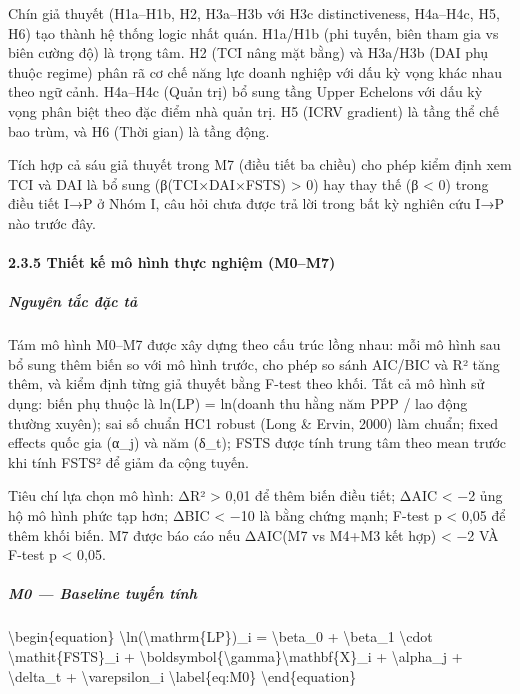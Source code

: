 \documentclass[12pt,a4paper]{article}
\begin{document}
Chín giả thuyết (H1a--H1b, H2, H3a--H3b với H3c distinctiveness,
H4a--H4c, H5, H6) tạo thành hệ thống logic nhất quán. H1a/H1b (phi
tuyến, biên tham gia vs biên cường độ) là trọng tâm. H2 (TCI nâng mặt
bằng) và H3a/H3b (DAI phụ thuộc regime) phân rã cơ chế năng lực doanh
nghiệp với dấu kỳ vọng khác nhau theo ngữ cảnh. H4a--H4c (Quản trị) bổ
sung tầng Upper Echelons với dấu kỳ vọng phân biệt theo đặc điểm nhà
quản trị. H5 (ICRV gradient) là tầng thể chế bao trùm, và H6 (Thời gian)
là tầng động.

Tích hợp cả sáu giả thuyết trong M7 (điều tiết ba chiều) cho phép kiểm
định xem TCI và DAI là bổ sung (β(TCI×DAI×FSTS) \textgreater{} 0) hay
thay thế (β \textless{} 0) trong điều tiết I→P ở Nhóm I, câu hỏi chưa
được trả lời trong bất kỳ nghiên cứu I→P nào trước đây.

\hypertarget{235-thiux1ebft-kux1ebf-muxf4-huxecnh-thux1ef1c-nghiux1ec7m-m0m7}{%
\paragraph{2.3.5 Thiết kế mô hình thực nghiệm
(M0--M7)}\label{235-thiux1ebft-kux1ebf-muxf4-huxecnh-thux1ef1c-nghiux1ec7m-m0m7}}

\hypertarget{nguyuxean-tux1eafc-ux111ux1eb7c-tux1ea3}{%
\subparagraph{Nguyên tắc đặc
tả}\label{nguyuxean-tux1eafc-ux111ux1eb7c-tux1ea3}}

Tám mô hình M0--M7 được xây dựng theo cấu trúc lồng nhau: mỗi mô hình
sau bổ sung thêm biến so với mô hình trước, cho phép so sánh AIC/BIC và
R² tăng thêm, và kiểm định từng giả thuyết bằng F-test theo khối. Tất cả
mô hình sử dụng: biến phụ thuộc là ln(LP) = ln(doanh thu hằng năm PPP /
lao động thường xuyên); sai số chuẩn HC1 robust (Long \& Ervin, 2000)
làm chuẩn; fixed effects quốc gia (α\_j) và năm (δ\_t); FSTS được tính
trung tâm theo mean trước khi tính FSTS² để giảm đa cộng tuyến.

Tiêu chí lựa chọn mô hình: ΔR² \textgreater{} 0,01 để thêm biến điều
tiết; ΔAIC \textless{} −2 ủng hộ mô hình phức tạp hơn; ΔBIC \textless{}
−10 là bằng chứng mạnh; F-test p \textless{} 0,05 để thêm khối biến. M7
được báo cáo nếu ΔAIC(M7 vs M4+M3 kết hợp) \textless{} −2 VÀ F-test p
\textless{} 0,05.

\hypertarget{m0--baseline-tuyux1ebfn-tuxednh}{%
\subparagraph{M0 --- Baseline tuyến
tính}\label{m0--baseline-tuyux1ebfn-tuxednh}}

\textbackslash begin\{equation\}
\textbackslash ln(\textbackslash mathrm\{LP\})\_i =
\textbackslash beta\_0 + \textbackslash beta\_1 \textbackslash cdot
\textbackslash mathit\{FSTS\}\_i +
\textbackslash boldsymbol\{\textbackslash gamma\}\textquotesingle\textbackslash mathbf\{X\}\_i
+ \textbackslash alpha\_j + \textbackslash delta\_t +
\textbackslash varepsilon\_i \textbackslash label\{eq:M0\}
\textbackslash end\{equation\}
\end{document}
